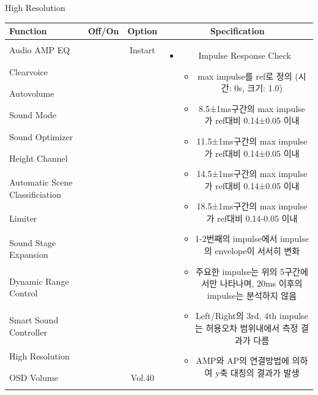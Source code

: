 \documentclass{beamer}
\begin{document}
\begin{frame}[t]{High Resolution}
\begin{tiny}
\begin{tabular}{@{}lccc@{}}
\toprule
Function & Off/On & Option & Specification \\
\midrule
Audio AMP EQ & \color{black}{Off} & Instart &
\multirow{13}{60mm}{
\begin{itemize}
\item Impulse Response Check
  \begin{itemize}
  \item max impulse를 ref로 정의 (시간: 0s, 크기: 1.0)
  \item 8.5±1ms구간의 max impulse가 ref대비 0.14±0.05 이내
  \item 11.5±1ms구간의 max impulse가 ref대비 0.14±0.05 이내
  \item 14.5±1ms구간의 max impulse가 ref대비 0.14±0.05 이내
  \item 18.5±1ms구간의 max impulse가 ref대비 0.14-0.05 이내
  \item 1-2번째의 impulse에서 impulse의 envelope이 서서히 변화
  \item 주요한 impulse는 위의 5구간에서만 나타나며, 20ms 이후의 impulse는 분석하지 않음
  \item Left/Right의 3rd, 4th impulse는 허용오차 범위내에서 측정 결과가 다름
  \item AMP와 AP의 연결방법에 의하여 y축 대칭의 결과가 발생
  \end{itemize}
\end{itemize}
} \\
Clearvoice & \color{black}{Off} & & \\
Autovolume & \color{black}{Off} & & \\
Sound Mode & \color{black}{Off} & & \\
Sound Optimizer & \color{black}{Off} & & \\
Height Channel & \color{black}{Off} & & \\
Automatic Scene Classificiation & \color{black}{Off} & & \\
Limiter & \color{black}{Off} & & \\
Sound Stage Expansion & \color{black}{Off} & & \\
Dynamic Range Control & \color{black}{Off} & & \\
Smart Sound Controller & \color{black}{Off} & & \\
High Resolution & \color{blue}{On} & & \\
OSD Volume & \color{blue}{On} & Vol.40 & \\
\midrule
\end{tabular}
\end{tiny}


\end{frame}
\end{document}
